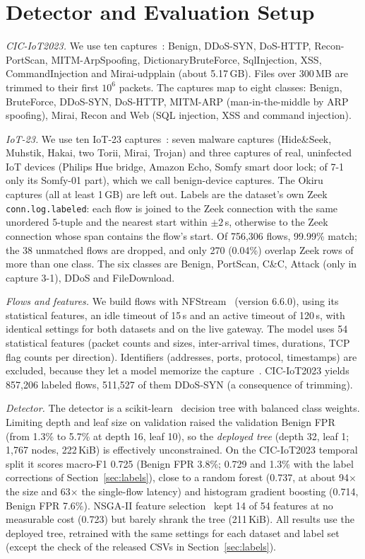 \section{Detector and Evaluation Setup}\label{sec:setup}

\emph{CIC-IoT2023.} We use ten captures~\cite{neto2023ciciot2023}: Benign, DDoS-SYN, DoS-HTTP, Recon-PortScan, MITM-ArpSpoofing, DictionaryBruteForce, SqlInjection, XSS, CommandInjection and Mirai-udpplain (about 5.17\,GB). Files over 300\,MB are trimmed to their first $10^6$ packets. The captures map to eight classes: Benign, BruteForce, DDoS-SYN, DoS-HTTP, MITM-ARP (man-in-the-middle by ARP spoofing), Mirai, Recon and Web (SQL injection, XSS and command injection).

\emph{IoT-23.} We use ten IoT-23 captures~\cite{garcia2020iot23}: seven malware captures (Hide\&Seek, Muhstik, Hakai, two Torii, Mirai, Trojan) and three captures of real, uninfected IoT devices (Philips Hue bridge, Amazon Echo, Somfy smart door lock; of 7-1 only its Somfy-01 part), which we call benign-device captures. The Okiru captures (all at least 1\,GB) are left out. Labels are the dataset's own Zeek \texttt{conn.log.labeled}: each flow is joined to the Zeek connection with the same unordered 5-tuple and the nearest start within $\pm2$\,s, otherwise to the Zeek connection whose span contains the flow's start. Of 756,306 flows, 99.99\% match; the 38 unmatched flows are dropped, and only 270 (0.04\%) overlap Zeek rows of more than one class. The six classes are Benign, PortScan, C\&C, Attack (only in capture 3-1), DDoS and FileDownload.

\emph{Flows and features.} We build flows with NFStream~\cite{aouini2022nfstream} (version 6.6.0), using its statistical features, an idle timeout of 15\,s and an active timeout of 120\,s, with identical settings for both datasets and on the live gateway. The model uses 54 statistical features (packet counts and sizes, inter-arrival times, durations, TCP flag counts per direction). Identifiers (addresses, ports, protocol, timestamps) are excluded, because they let a model memorize the capture~\cite{arp2022dos}. CIC-IoT2023 yields 857,206 labeled flows, 511,527 of them DDoS-SYN (a consequence of trimming).

\emph{Detector.} The detector is a scikit-learn~\cite{pedregosa2011sklearn} decision tree with balanced class weights. Limiting depth and leaf size on validation raised the validation Benign FPR (from 1.3\% to 5.7\% at depth 16, leaf 10), so the \emph{deployed tree} (depth 32, leaf 1; 1,767 nodes, 222\,KiB) is effectively unconstrained. On the CIC-IoT2023 temporal split it scores macro-F1 0.725 (Benign FPR 3.8\%; 0.729 and 1.3\% with the label corrections of Section~\ref{sec:labels}), close to a random forest (0.737, at about 94$\times$ the size and 63$\times$ the single-flow latency) and histogram gradient boosting (0.714, Benign FPR 7.6\%). NSGA-II feature selection~\cite{deb2002nsga2,blank2020pymoo} kept 14 of 54 features at no measurable cost (0.723) but barely shrank the tree (211\,KiB). All results use the deployed tree, retrained with the same settings for each dataset and label set (except the check of the released CSVs in Section~\ref{sec:labels}).

